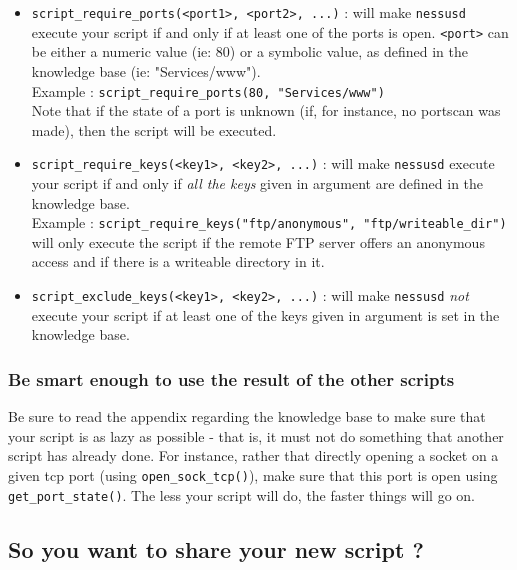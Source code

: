 \documentclass{article}
\begin{document}
\begin{itemize}
\item \verb+script_require_ports(<port1>, <port2>, ...)+ : will make \verb+nessusd+ execute your script if and only if at least one of the ports is open. \verb+<port>+ can be either a numeric value (ie: 80) or a symbolic value, as defined in the knowledge base (ie: "Services/www").\\
Example : \verb+script_require_ports(80, "Services/www")+\\
Note that if the state of a port is unknown (if, for instance, no portscan was made), then the script will be executed.



\item \verb+script_require_keys(<key1>, <key2>, ...)+ : will make \verb+nessusd+ execute your script if and only if \textit{all the keys} given in argument are defined in the knowledge base. \\
Example : \verb+script_require_keys("ftp/anonymous", "ftp/writeable_dir")+ will only execute the script if the remote FTP server offers an anonymous access and if there is a writeable directory in it.

\item \verb+script_exclude_keys(<key1>, <key2>, ...)+ : will make \verb+nessusd+ \textit{not} execute your script if at least one of the keys given in argument is set in the knowledge base.
\end{itemize}

\subsubsection{Be smart enough to use the result of the other scripts}

Be sure to read the appendix regarding the knowledge base to make sure that your script is as lazy as possible - that is, it must not do something that another script has already done. For instance, rather that directly opening a socket
on a given tcp port (using \verb+open_sock_tcp()+), make sure that this port is open using \verb+get_port_state()+. The less your script will do, the faster things will go on.

\subsection{So you want to share your new script ?}
\end{document}

